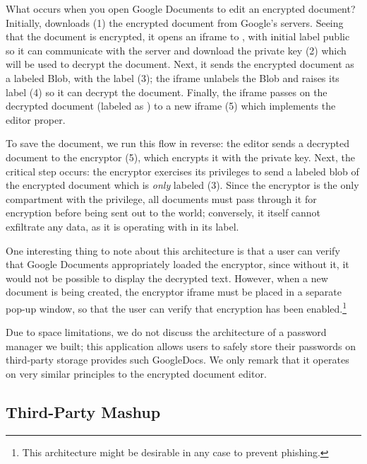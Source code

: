 What occurs when you open Google Documents to edit an encrypted
document?
%
Initially,  downloads (1) the encrypted document from
Google's servers.
%
Seeing that the document is encrypted, it opens an iframe to
, with initial label 
public so it can communicate with the  server and
download the private key (2) which will be used to decrypt the document.
%
Next, it sends the encrypted document as a labeled Blob, with the label
 (3); the iframe unlabels the Blob and
raises its label (4) so it can decrypt the document.
%
Finally, the iframe passes on the decrypted document (labeled as
) to a new iframe (5) which
implements the editor proper.

To save the document, we run this flow in reverse: the editor sends a
decrypted document to the encryptor (5), which encrypts it with the
private key.  Next, the critical step occurs: the encryptor exercises its privileges
to send a labeled blob of the encrypted document which is \emph{only}
labeled  (3).  Since the encryptor is the only compartment
with the  privilege, all documents must pass through it for
encryption before being sent out to the world; conversely, it itself cannot
exfiltrate any data, as it is operating with  in its label.

One interesting thing to note about this architecture is that a user can
verify that Google Documents appropriately loaded the encryptor, since
without it, it would not be possible to display the decrypted text.  However, when
a new document is being created, the encryptor iframe must be placed
in a separate pop-up window, so that the user can verify that encryption
has been enabled.\footnote{This architecture might be desirable in any case
to prevent phishing.}

Due to space limitations, we do not discuss the architecture of a \sys{} 
password manager we built; this application allows users to safely store their
passwords on third-party storage provides such GoogleDocs. We only remark that
it operates on very similar principles to the encrypted document editor.

\subsection{Third-Party Mashup}
\label{sec:apps-mashup}

